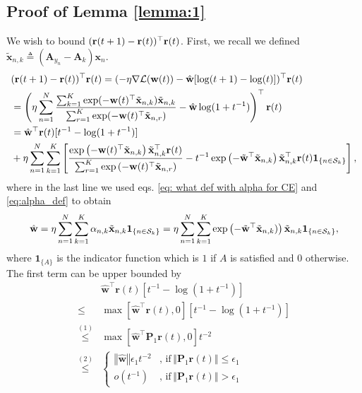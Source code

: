 \documentclass[twoside,11pt,english]{article}
\newcommand{\sumk}{\sum_{k=1}^{K}}
\newcommand{\sumr}{\sum_{r=1}^{K}}
\newcommand{\xtilde}{\tilde{\vect{x}}_{n,k}}
\newcommand{\xtilder}{\tilde{\vect{x}}_{n,r}}
\newcommand{\vect}[1]{\mathbf{#1}}
\newcommand{\bm}[1]{\ensuremath{\boldsymbol{#1}}}
\newcommand{\indicator}[1]{\bm{1}_{\{ #1 \}}}
\begin{document}
\subsection{Proof of Lemma \ref{lemma:1}} \label{appendix: proof of auxilary Lemma CE}
\multiAuxlemma*
\noindent We wish to bound $(\mathbf{r}(t+1)-\mathbf{r}(t))^\top \mathbf{r}(t)$. 
First, we recall we defined $\xtilde \triangleq (\vect{A}_{y_n}-\vect{A}_k)\vect{x}_n$.
\begin{align} \label{eq: (r(t+1)-r(t))r(t) bound Multi}
&(\vect{r}(t+1)-\vect{r}(t))^\top \vect{r}(t) = (-\eta \nabla \mathcal{L}(\vect{w}(t)) - \hat{\vect{w}}[\log(t+1)-\log(t)])^\top \vect{r}(t) \nonumber\\
&=  \left( \eta \sumn \frac{\sumk \e(-\wvec(t)^\top\xtilde)\xtilde}{\sumr \e(-\wvec(t)^\top\xtilder)} - \hat{\vect{w}}\log(1+t^{-1})\right) ^\top \vect{r}(t) \nonumber\\
&= \hat{\vect{w}}^\top \vect{r}(t)[t^{-1}-\log(1+t^{-1})] \\
&+\eta \sumn\sumk \left[  \frac{\e\left(-\wvec(t)^\top\xtilde\right)\xtilde^\top\rvec(t)}{\sumr \e\left(-\wvec(t)^\top\xtilder\right)} - t^{-1}\e\left(-\wtilde^\top \xtilde\right)\xtilde^\top\rvec(t)\indicator{n\in\mathcal{S}_k}\right],
\end{align}
where in the last line we used eqs. \ref{eq: what def with alpha for CE} and \ref{eq:alpha_def} to obtain
\begin{equation*}
	 \hat{\vect{w}}=\eta \sumn \sumk \alpha_{n,k}\xtilde \indicator{n\in\mathcal{S}_k} = \eta \sumn \sumk \e\left( -\tilde{\vect{w}}^\top\xtilde)\right) \xtilde \indicator{n\in\mathcal{S}_k},
\end{equation*}
where $\indicator{A}$ is the indicator function which is $1$ if $A$ is satisfied and 0 otherwise.
\newpage
The first term can be upper bounded by 
\begin{align}
& \hat{\mathbf{w}}^{\top}\mathbf{r}\left(t\right)\left[t^{-1}-\log\left(1+t^{-1}\right)\right]\nonumber \\
\leq & \max\left[\hat{\mathbf{w}}^{\top}\mathbf{r}\left(t\right),0\right]\left[t^{-1}-\log\left(1+t^{-1}\right)\right]\nonumber \\
\overset{\left(1\right)}{\leq} & \max\left[\hat{\mathbf{w}}^{\top}\mathbf{P}_{1}\mathbf{r}\left(t\right),0\right]t^{-2}\nonumber \\
\overset{\left(2\right)}{\leq} & \begin{cases}
\mathbf{\left\Vert \hat{\mathbf{w}}\right\Vert }\epsilon_{1}t^{-2} & ,\,\mathrm{if}\,\left\Vert \mathbf{P}_{1}\mathbf{r}\left(t\right)\right\Vert \leq\epsilon_{1}\\
o\left(t^{-1}\right) & ,\,\mathrm{if}\,\left\Vert \mathbf{P}_{1}\mathbf{r}\left(t\right)\right\Vert >\epsilon_{1}
\end{cases}\label{eq: w_hat r bound 1 Multi}
\end{align}
\end{document}
